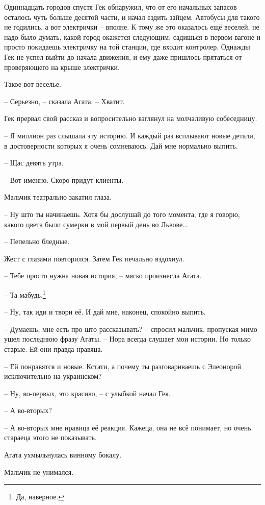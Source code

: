 \documentclass[
  a5paperpaper,
  DIV=11,
  numbers=noendperiod]{scrreprt}
\begin{document}
Одиннадцать городов спустя Гек обнаружил, что от его начальных запасов
осталось чуть больше десятой части, и начал ездить зайцем. Автобусы для
такого не годились, а вот электрички -- вполне. К тому же это оказалось
ещё веселей, не надо было думать, какой город окажется следующим:
садишься в первом вагоне и просто покидаешь электричку на той станции,
где входит контролер. Однажды Гек не успел выйти до начала движения, и
ему даже пришлось прятаться от проверяющего на крыше электрички.

Такое вот веселье.

-- Серьезно, -- сказала Агата. -- Хватит.

Гек прервал свой рассказ и вопросительно взглянул на молчаливую
собеседницу.

-- Я миллион раз слышала эту историю. И каждый раз всплывают новые
детали, в достоверности которых я очень сомневаюсь. Дай мне нормально
выпить.

-- Щас девять утра.

-- Вот именно. Скоро придут клиенты.

Мальчик театрально закатил глаза.

-- Ну што ты начинаешь. Хотя бы дослушай до того момента, где я говорю,
какого цвета были сумерки в мой первый день во Львове\ldots{}

-- Пепельно бледные.

Жест с глазами повторился. Затем Гек печально вздохнул.

-- Тебе просто нужна новая история, -- мягко произнесла Агата.

-- Та мабудь.\footnote{Да, наверное.}

-- Ну, так иди и твори её. И дай мне, наконец, спокойно выпить.

-- Думаешь, мне есть про што рассказывать? -- спросил мальчик, пропуская
мимо ушел последнюю фразу Агаты. -- Нора всегда слушает мои истории. Но
только старые. Ей они правда нравяца.

-- Ей понравятся и новые. Кстати, а почему ты разговариваешь с Элеонорой
исключительно на украинском?

-- Ну, во-первых, это красиво, -- с улыбкой начал Гек.

-- А во-вторых?

-- А во-вторых мне нравица её реакция. Кажеца, она не всё понимает, но
очень стараеца этого не показывать.

Агата ухмыльнулась винному бокалу.

Мальчик не унимался.
\end{document}
